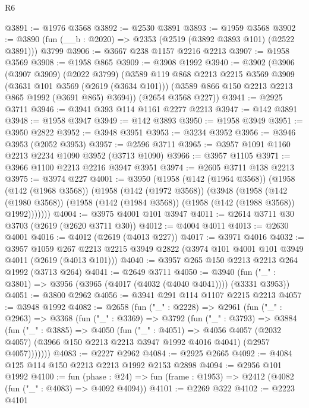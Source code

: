 \begin{lexlean}{R6}
\begin{coremodule}
@3891 := @1976 @3568
@3892 := @2530 @3891
@3893 := @1959 @3568
@3902 := @3890 (fun (__b : @2020) => @2353 (@2519 (@3892 @3893 @101) (@2522 @3891))) @3799
@3906 := @3667 @238 @1157 @2216 @2213
@3907 := @1958 @3569
@3908 := @1958 @865
@3909 := @3908 @1992
@3940 := @3902
    (@3906
      (@3907 @3909)
      (@2022 @3799)
      (@3589
        @119
        @868
        @2213
        @2215
        @3569
        @3909
        (@3631 @101 @3569 (@2619 (@3634 @101)))
        (@3589 @866 @150 @2213 @2213 @865 @1992 (@3691 @865) @3694))
      (@2654 @3568 @227))
@3941 := @2925 @3711
@3946 := @3941 @393 @114 @1161 @2277 @2213
@3947 := @142 @3891
@3948 := @1958 @3947
@3949 := @142 @3893
@3950 := @1958 @3949
@3951 := @3950 @2822
@3952 := @3948 @3951
@3953 := @3234 @3952
@3956 := @3946 @3953 (@2052 @3953)
@3957 := @2596 @3711
@3965 := @3957 @1091 @1160 @2213 @2234 @1090 @3952 (@3713 @1090)
@3966 := @3957 @1105
@3971 := @3966 @1100 @2213 @2216 @3947 @3951
@3974 := @2605 @3711 @138 @2213
@3975 := @3974 @227
@4001 := @3950
    (@1958
      (@142 (@1964 @3568))
      (@1958
        (@142 (@1968 @3568))
        (@1958
          (@142 (@1972 @3568))
          (@3948
            (@1958
              (@142 (@1980 @3568))
              (@1958 (@142 (@1984 @3568)) (@1958 (@142 (@1988 @3568)) @1992)))))))
@4004 := @3975 @4001 @101 @3947
@4011 := @2614 @3711 @30 @3703 (@2619 (@2620 @3711 @30))
@4012 := @4004 @4011
@4013 := @2630 @4001
@4016 := @4012 (@2619 (@4013 @227))
@4017 := @3971 @4016
@4032 := @3957
    @1059
    @267
    @2213
    @2215
    @3949
    @2822
    (@3974 @101 @4001 @101 @3949 @4011 (@2619 (@4013 @101)))
@4040 := @3957 @265 @150 @2213 @2213 @264 @1992 (@3713 @264)
@4041 := @2649 @3711
@4050 := @3940 (fun ("_" : @3801) => @3956 (@3965 (@4017 (@4032 (@4040 @4041)))) (@3331 @3953))
@4051 := @3800 @2962
@4056 := @3941 @291 @114 @1107 @2215 @2213
@4057 := @3948 @1992
@4082 := @2658
    (fun ("_" : @2228) =>
    @2961
      (fun ("_" : @2963) =>
      @3368
        (fun ("_" : @3369) =>
        @3792
          (fun ("_" : @3793) =>
          @3884
            (fun ("_" : @3885) =>
            @4050
              (fun ("_" : @4051) =>
              @4056
                @4057
                (@2032 @4057)
                (@3966 @150 @2213 @2213 @3947 @1992 @4016 @4041)
                (@2957 @4057)))))))
@4083 := @2227 @2962
@4084 := @2925 @2665
@4092 := @4084 @125 @114 @150 @2213 @2213 @1992 @2153 @2898
@4094 := @2956 @101 @1992
@4100 := fun (phase : @24) =>
  fun (frame : @1953) => @2412 (@4082 (fun ("_" : @4083) => @4092 @4094))
@4101 := @2269 @322
@4102 := @2223 @4101

\end{coremodule}
\end{lexlean}
